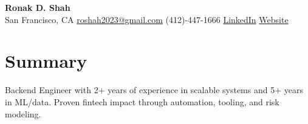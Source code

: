\documentclass[letterpaper,10pt]{article}
\begin{document}
\begin{center}
    \textbf{\Huge Ronak D. Shah}\\
    San Francisco, CA \hspace{1em} \href{mailto:roshah2023@gmail.com}{roshah2023@gmail.com} \hspace{1em} (412)-447-1666 \hspace{1em} \href{http://www.linkedin.com/in/ronakshah52}{LinkedIn} \hspace{1em} \href{https://ronakdshah.github.io/}{Website}
\end{center}
\section*{Summary}
Backend Engineer with 2+ years of experience in scalable systems and 5+ years in ML/data. Proven fintech impact through automation, tooling, and risk modeling.
\end{document}
